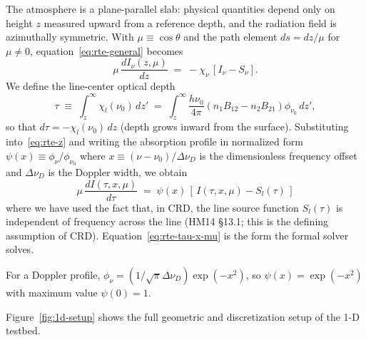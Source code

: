 \documentclass[11pt]{article}
\begin{document}
The atmosphere is a plane-parallel slab: physical quantities depend only on
height $z$ measured upward from a reference depth, and the radiation field is
azimuthally symmetric. With $\mu \equiv \cos\theta$ and the path element
$ds = dz/\mu$ for $\mu \neq 0$, equation~\eqref{eq:rte-general} becomes
\begin{equation}
\mu\,\frac{dI_\nu(z, \mu)}{dz} \;=\; -\chi_\nu\, [I_\nu - S_\nu] .
\label{eq:rte-z}
\end{equation}
We define the line-center optical depth
\begin{equation}
\tau \;\equiv\; \int_z^{\infty} \chi_l(\nu_0)\, dz' \;=\; \int_z^{\infty}
\frac{h\nu_0}{4\pi}(n_1 B_{12} - n_2 B_{21})\phi_{\nu_0}\, dz' ,
\label{eq:tau-def}
\end{equation}
so that $d\tau = -\chi_l(\nu_0)\, dz$ (depth grows inward from the surface).
Substituting into~\eqref{eq:rte-z} and writing the absorption profile
in normalized form $\psi(x) \equiv \phi_\nu/\phi_{\nu_0}$ where
$x \equiv (\nu - \nu_0)/\Delta\nu_D$ is the dimensionless frequency offset
and $\Delta\nu_D$ is the Doppler width, we obtain
\begin{equation}
\boxed{\;\mu\,\frac{dI(\tau, x, \mu)}{d\tau}
\;=\; \psi(x)\,[\, I(\tau, x, \mu) - S_l(\tau)\,] \;}
\label{eq:rte-tau-x-mu}
\end{equation}
where we have used the fact that, in CRD, the line source function
$S_l(\tau)$ is independent of frequency across the line (HM14 §13.1;
this is the defining assumption of CRD).  Equation~\eqref{eq:rte-tau-x-mu}
is the form the formal solver solves.

For a Doppler profile, $\phi_\nu = (1/\sqrt{\pi}\Delta\nu_D) \exp(-x^2)$,
so $\psi(x) = \exp(-x^2)$ with maximum value $\psi(0) = 1$.

Figure~\ref{fig:1d-setup} shows the full geometric and discretization
setup of the 1-D testbed.
\end{document}
